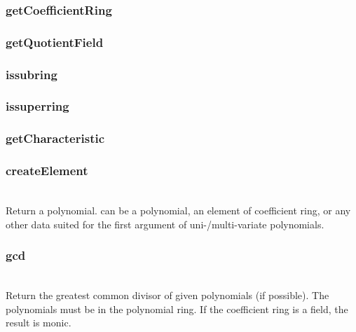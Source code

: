  \subsubsection{getCoefficientRing}

 \subsubsection{getQuotientField}

 \subsubsection{issubring}

 \subsubsection{issuperring}

 \subsubsection{getCharacteristic}

 \subsubsection{createElement}
 \\
 \quad Return a polynomial.  can be a polynomial,
 an element of coefficient ring, or any other data suited for the first
 argument of uni-/multi-variate polynomials.

 \subsubsection{gcd}
 \\
 \quad Return the greatest common divisor of given polynomials (if possible).
 The polynomials must be in the polynomial ring.
 If the coefficient ring is a field, the result is monic.

